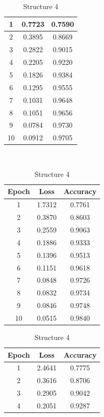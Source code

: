 \documentclass{article}
\begin{document}
\begin{table}[]
\begin{minipage}[b]{0.23\linewidth}
\begin{tabular}{|c|c|c|}
    \hline
    1&0.7723&0.7590\\
    \hline
    2&0.3895&0.8669\\
    \hline
    3&0.2822&0.9015\\
    \hline
    4&0.2205&0.9220\\
    \hline
    5&0.1826&0.9384\\
    \hline
    6&0.1295&0.9555\\
    \hline
    7&0.1031&0.9648\\
    \hline
    8&0.1051&0.9656\\
    \hline
    9&0.0784&0.9730\\
    \hline
    10&0.0912&0.9705\\
    \hline
  \end{tabular}
  \caption*{Structure 3}
  \end{minipage}
  \\
  \begin{minipage}[b]{0.23\linewidth}
  \tiny
  \begin{tabular}{|c|c|c|}
    \hline
    Epoch&Loss&Accuracy\\
    \hline
    1&1.7312&0.7761\\
    \hline
    2&0.3870&0.8603\\
    \hline
    3&0.2559&0.9063\\
    \hline
    4&0.1886&0.9333\\
    \hline
    5&0.1396&0.9513\\
    \hline
    6&0.1151&0.9618\\
    \hline
    7&0.0848&0.9726\\
    \hline
    8&0.0832&0.9734\\
    \hline
    9&0.0846&0.9748\\
    \hline
    10&0.0515&0.9840\\
    \hline
  \end{tabular}
  \caption*{Structure 4}
  \end{minipage}
  \hspace{0.5cm}
  \begin{minipage}[b]{0.23\linewidth}
  \tiny
  \begin{tabular}{|c|c|c|}
    \hline
    Epoch&Loss&Accuracy\\
    \hline
    1&2.4641&0.7775\\
    \hline
    2&0.3616&0.8706\\
    \hline
    3&0.2905&0.9042\\
    \hline
    4&0.2051&0.9287\\

\end{tabular}
\end{minipage}
\end{table}
\end{document}
